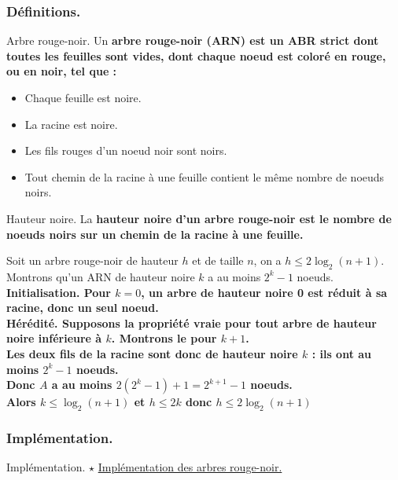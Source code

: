 \documentclass[french, 11pt]{article}
\begin{document}
\subsubsection{Définitions.}
\begin{defi}{Arbre rouge-noir.}{}
    Un \bf{arbre rouge-noir (ARN)} est un ABR strict dont toutes les feuilles sont vides, dont chaque noeud est coloré en rouge, ou en noir, tel que :
    \begin{itemize}[topsep=0pt,itemsep=-0.9 ex]
        \item Chaque feuille est noire.
        \item La racine est noire.
        \item Les fils rouges d'un noeud noir sont noirs.
        \item Tout chemin de la racine à une feuille contient le même nombre de noeuds noirs.
    \end{itemize}
\end{defi}

\begin{defi}{Hauteur noire.}{}
    La \bf{hauteur noire} d'un arbre rouge-noir est le nombre de noeuds noirs sur un chemin de la racine à une feuille.
\end{defi}

\begin{prop}{}{}
    Soit un arbre rouge-noir de hauteur $h$ et de taille $n$, on a $h\leq 2\log_2(n+1)$.
    \tcblower
    Montrons qu'un ARN de hauteur noire $k$ a au moins $2^k-1$ noeuds.\\
    \bf{Initialisation.} Pour $k=0$, un arbre de hauteur noire 0 est réduit à sa racine, donc un seul noeud.\\
    \bf{Hérédité.} Supposons la propriété vraie pour tout arbre de hauteur noire inférieure à $k$. Montrons le pour $k+1$.\\
    Les deux fils de la racine sont donc de hauteur noire $k$ : ils ont au moins $2^k-1$ noeuds.\\
    Donc $A$ a au moins $2(2^k-1)+1=2^{k+1}-1$ noeuds.\\
    Alors $k \leq \log_2(n+1)$ et $h\leq2k$ donc $h\leq2\log_2(n+1)$
\end{prop}

\subsubsection{Implémentation.}
\begin{thm}{Implémentation. $\star$}{}
    \href{https://anthonylick.com/wp-content/uploads/mp2i\_chap16.pdf}{Implémentation des arbres rouge-noir.}
\end{thm}
\end{document}
